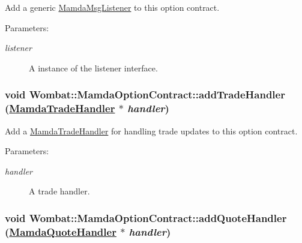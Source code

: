 Add a generic \hyperlink{classWombat_1_1MamdaMsgListener}{Mamda\-Msg\-Listener} to this option contract. 

\begin{Desc}
\item[Parameters:]
\begin{description}
\item[{\em listener}]A instance of the listener interface. \end{description}
\end{Desc}
\hypertarget{classWombat_1_1MamdaOptionContract_0b3314cdac09a861df9f12bc8ef5e510}{
\subsubsection[addTradeHandler]{\setlength{\rightskip}{0pt plus 5cm}void Wombat::Mamda\-Option\-Contract::add\-Trade\-Handler (\hyperlink{classWombat_1_1MamdaTradeHandler}{Mamda\-Trade\-Handler} $\ast$ {\em handler})}}
\label{classWombat_1_1MamdaOptionContract_0b3314cdac09a861df9f12bc8ef5e510}


Add a \hyperlink{classWombat_1_1MamdaTradeHandler}{Mamda\-Trade\-Handler} for handling trade updates to this option contract. 

\begin{Desc}
\item[Parameters:]
\begin{description}
\item[{\em handler}]A trade handler. \end{description}
\end{Desc}
\hypertarget{classWombat_1_1MamdaOptionContract_c19937c97b686522612cd60faa52330b}{
\subsubsection[addQuoteHandler]{\setlength{\rightskip}{0pt plus 5cm}void Wombat::Mamda\-Option\-Contract::add\-Quote\-Handler (\hyperlink{classWombat_1_1MamdaQuoteHandler}{Mamda\-Quote\-Handler} $\ast$ {\em handler})}}
\label{classWombat_1_1MamdaOptionContract_c19937c97b686522612cd60faa52330b}


